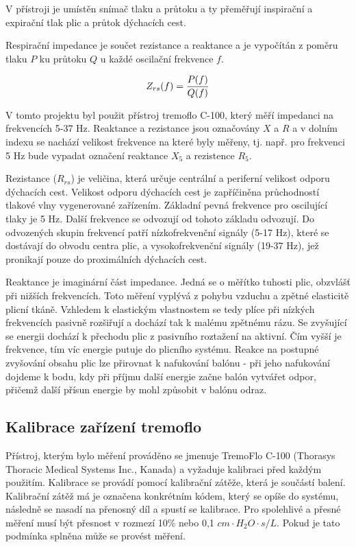 V přístroji je umístěn snímač tlaku a průtoku a ty přeměřují inspirační a expirační tlak plic a průtok dýchacích cest. 

Respirační impedance je součet rezistance a reaktance a je vypočítán z poměru tlaku  $P$ ku průtoku $Q$ u každé oscilační frekvence $f$. \cite{Vlcek2018}

\begin{equation}
	\label{rce:2}
	Z_{rs}(f) = {P(f) \over Q(f)} 
\end{equation}


V tomto projektu byl použit přístroj tremoflo C-100, který měří impedanci na frekvencích 5-37 Hz. Reaktance a rezistance jsou označovány $X$ a $R$ a v dolním indexu se nachází velikost frekvence na které byly měřeny, tj. např. pro frekvenci 5 Hz bude vypadat označení reaktance $X_5$ a rezistence $R_5$. 

Rezistance ($R_{rs}$) je veličina, která určuje centrální a periferní velikost odporu dýchacích cest. Velikost odporu dýchacích cest je zapříčiněna průchodností tlakové vlny vygenerované zařízením. Základní pevná frekvence pro oscilující tlaky je 5 Hz. Další frekvence se odvozují od tohoto základu odvozují. Do odvozených skupin frekvencí patří nízkofrekvenční signály (5-17 Hz), které se dostávají do obvodu centra plic, a vysokofrekvenční signály (19-37 Hz), jež pronikají pouze do proximálních dýchacích cest. 

Reaktance je imaginární část impedance. Jedná se o měřítko tuhosti plic, obzvlášť při nižších frekvencích. Toto měření vyplývá z pohybu vzduchu  a zpětné elasticitě plicní tkáně. Vzhledem k elastickým vlastnostem se tedy plíce při nízkých frekvencích pasivně rozšiřují a dochází tak k malému zpětnému rázu. Se zvyšující se energii dochází k přechodu plic z pasivního roztažení na aktivní. Čím vyšší je frekvence, tím víc energie putuje do plicního systému. Reakce na postupné zvyšování obsahu plic lze přirovnat k nafukování balónu - při jeho nafukování dojdeme k bodu, kdy při příjmu další energie začne balón vytvářet odpor, přičemž další přísun energie by mohl způsobit v balónu odraz.


\subsection{Kalibrace zařízení tremoflo}
Přístroj, kterým bylo měření prováděno se jmenuje TremoFlo C-100 (Thorasys Thoracic Medical Systems Inc., Kanada) a vyžaduje kalibraci před každým použitím. Kalibrace se provádí pomocí kalibrační zátěže, která je součástí balení. Kalibrační zátěž má je označena konkrétním kódem, který se opíše do systému, následně  se nasadí na přenosný díl a spustí se kalibrace. Pro spolehlivé a přesné měření musí být přesnost 
v rozmezí 10\% nebo 0,1 $cm \cdot H_{2}O \cdot s/L$. Pokud je tato podmínka splněna může se provést měření. \cite{Vlcek2018}

